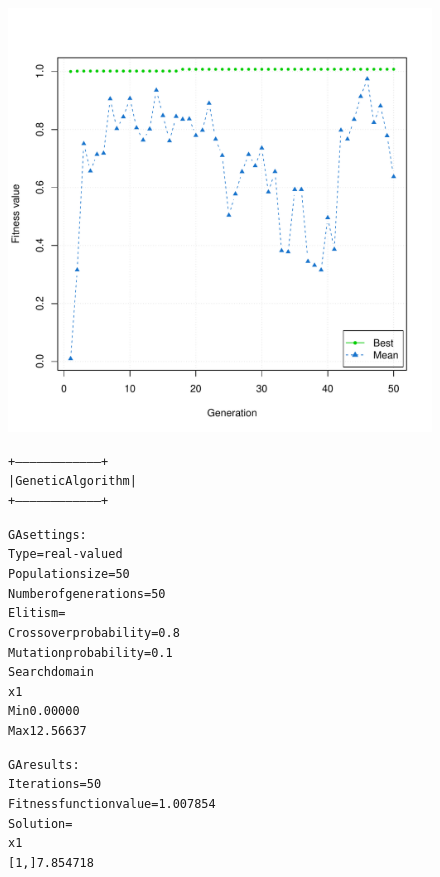 \documentclass{article}
\begin{document}
\begin{figure}
	\begin{center}
		\begin{minipage}[h!]{0.7\textwidth}
			\includegraphics[width=\textwidth]{gaConvergeR.pdf}
		\end{minipage}
		\begin{minipage}[h!]{0.29\textwidth}
			\begin{alltt}
			+-----------------------------------+
			|         Genetic Algorithm         |
			+-----------------------------------+
			
			GA settings: 
			Type                  =  real-valued 
			Population size       =  50 
			Number of generations =  50 
			Elitism               =   
			Crossover probability =  0.8 
			Mutation probability  =  0.1 
			Search domain 
			          x1
			Min  0.00000
			Max 12.56637
			
			GA results: 
			Iterations             = 50 
			Fitness function value = 1.007854 
			Solution               = 
			           x1
			[1,] 7.854718
			\end{alltt}
		\end{minipage}
	\end{center}
\end{figure}

\clearpage
\end{document}
